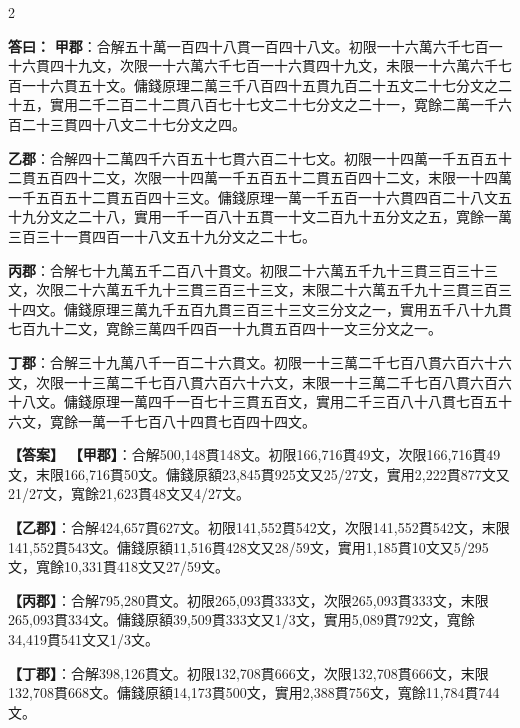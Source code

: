 \documentclass[11pt,a4paper]{article}
\newcommand{\ClassicalAnswer}[1]{\par\noindent\textbf{\color{answercolor}答曰：}#1\par}
\newcommand{\ModernAnswer}[1]{\par\noindent\textbf{\color{answercolor}【答案】}#1\par}
\begin{document}
\begin{paracol}{2}

\ClassicalAnswer{%
\textbf{甲郡}：合解五十萬一百四十八貫一百四十八文。初限一十六萬六千七百一十六貫四十九文，次限一十六萬六千七百一十六貫四十九文，未限一十六萬六千七百一十六貫五十文。傭錢原理二萬三千八百四十五貫九百二十五文二十七分文之二十五，實用二千二百二十二貫八百七十七文二十七分文之二十一，寛餘二萬一千六百二十三貫四十八文二十七分文之四。

\textbf{乙郡}：合解四十二萬四千六百五十七貫六百二十七文。初限一十四萬一千五百五十二貫五百四十二文，次限一十四萬一千五百五十二貫五百四十二文，末限一十四萬一千五百五十二貫五百四十三文。傭錢原理一萬一千五百一十六貫四百二十八文五十九分文之二十八，實用一千一百八十五貫一十文二百九十五分文之五，寛餘一萬三百三十一貫四百一十八文五十九分文之二十七。

\textbf{丙郡}：合解七十九萬五千二百八十貫文。初限二十六萬五千九十三貫三百三十三文，次限二十六萬五千九十三貫三百三十三文，末限二十六萬五千九十三貫三百三十四文。傭錢原理三萬九千五百九貫三百三十三文三分文之一，實用五千八十九貫七百九十二文，寛餘三萬四千四百一十九貫五百四十一文三分文之一。

\textbf{丁郡}：合解三十九萬八千一百二十六貫文。初限一十三萬二千七百八貫六百六十六文，次限一十三萬二千七百八貫六百六十六文，末限一十三萬二千七百八貫六百六十八文。傭錢原理一萬四千一百七十三貫五百文，實用二千三百八十八貫七百五十六文，寛餘一萬一千七百八十四貫七百四十四文。}

\switchcolumn

\ModernAnswer{%
\textbf{【甲郡】}：合解500,148貫148文。初限166,716貫49文，次限166,716貫49文，末限166,716貫50文。傭錢原額23,845貫925文又25/27文，實用2,222貫877文又21/27文，寬餘21,623貫48文又4/27文。

\textbf{【乙郡】}：合解424,657貫627文。初限141,552貫542文，次限141,552貫542文，末限141,552貫543文。傭錢原額11,516貫428文又28/59文，實用1,185貫10文又5/295文，寬餘10,331貫418文又27/59文。

\textbf{【丙郡】}：合解795,280貫文。初限265,093貫333文，次限265,093貫333文，末限265,093貫334文。傭錢原額39,509貫333文又1/3文，實用5,089貫792文，寬餘34,419貫541文又1/3文。

\textbf{【丁郡】}：合解398,126貫文。初限132,708貫666文，次限132,708貫666文，末限132,708貫668文。傭錢原額14,173貫500文，實用2,388貫756文，寬餘11,784貫744文。
}

\end{paracol}
\end{document}
